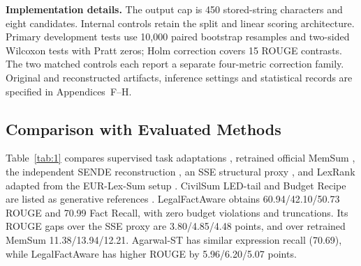 \documentclass[10pt,twocolumn,letterpaper]{article}
\begin{document}
\textbf{Implementation details.} The output cap is 450 stored-string characters and eight candidates. Internal controls retain the split and linear scoring architecture. Primary development tests use 10,000 paired bootstrap resamples and two-sided Wilcoxon tests with Pratt zeros; Holm correction covers 15 ROUGE contrasts. The two matched controls each report a separate four-metric correction family. Original and reconstructed artifacts, inference settings and statistical records are specified in Appendices~F--H.

\subsection{Comparison with Evaluated Methods}\label{overall-comparison-competitive-performance-within-the-target-budget}
Table~\ref{tab:1} compares supervised task adaptations \citep{ref3,ref4,ref13}, retrained official MemSum \citep{ref2}, the independent SENDE reconstruction \citep{ref5}, an SSE structural proxy \citep{ref7}, and LexRank adapted from the EUR-Lex-Sum setup \citep{lexrank2004,ref14}. CivilSum LED-tail and Budget Recipe are listed as generative references \citep{ref15,ref16}. LegalFactAware obtains 60.94/42.10/50.73 ROUGE and 70.99 Fact Recall, with zero budget violations and truncations. Its ROUGE gaps over the SSE proxy are 3.80/4.85/4.48 points, and over retrained MemSum 11.38/13.94/12.21. Agarwal-ST has similar expression recall (70.69), while LegalFactAware has higher ROUGE by 5.96/6.20/5.07 points.
\end{document}
